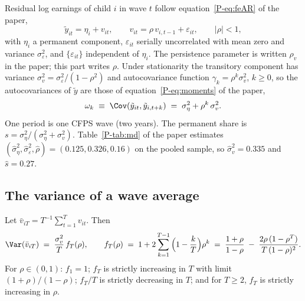 Residual log earnings of child $i$ in wave $t$ follow
equation~\eqref{P-eq:feAR} of the paper,
\begin{equation}
\tilde y_{it} = \eta_i + v_{it}, \qquad
v_{it} = \rho\, v_{i,t-1} + \varepsilon_{it}, \qquad |\rho| < 1,
\label{fr:eq:model}
\end{equation}
with $\eta_i$ a permanent component, $\varepsilon_{it}$ serially
uncorrelated with mean zero and variance $\sigma^2_\varepsilon$, and
$\{\varepsilon_{it}\}$ independent of $\eta_i$. The persistence parameter
is written $\rho_v$ in the paper; this part writes $\rho$. Under
stationarity the transitory component has variance
$\sigma^2_v = \sigma^2_\varepsilon/(1-\rho^2)$ and autocovariance function
$\gamma_k = \rho^{k}\sigma^2_v$, $k \ge 0$, so the autocovariances of
$\tilde y$ are those of equation~\eqref{P-eq:moments} of the paper,
\begin{equation}
\omega_k \;\equiv\; \Cov(\tilde y_{it}, \tilde y_{i,t+k}) \;=\; \sigma^2_\eta + \rho^{k}\,\sigma^2_v .
\label{fr:eq:omega}
\end{equation}
One period is one CFPS wave (two years). The permanent share is
$s = \sigma^2_\eta/(\sigma^2_\eta + \sigma^2_v)$. Table~\ref{P-tab:md} of
the paper estimates $(\hat\sigma^2_\eta, \hat\sigma^2_\varepsilon, \hat\rho) =
(0.125, 0.326, 0.16)$ on the pooled sample, so $\hat\sigma^2_v = 0.335$ and
$\hat s = 0.27$.

\subsection{The variance of a wave average}

\begin{proposition}
\label{fr:prop:fT}
Let $\bar v_{iT} = T^{-1}\sum_{t=1}^{T} v_{it}$. Then
\begin{equation}
\Var(\bar v_{iT}) \;=\; \frac{\sigma^2_v}{T}\, f_T(\rho), \qquad
f_T(\rho) \;=\; 1 + 2\sum_{k=1}^{T-1}\Big(1 - \frac{k}{T}\Big)\rho^{k}
\;=\; \frac{1+\rho}{1-\rho} \;-\; \frac{2\rho\,(1-\rho^{T})}{T\,(1-\rho)^{2}} .
\label{fr:eq:fT}
\end{equation}
For $\rho \in (0,1)$: $f_1 = 1$; $f_T$ is strictly increasing in $T$ with
limit $(1+\rho)/(1-\rho)$; $f_T/T$ is strictly decreasing in $T$; and for
$T \ge 2$, $f_T$ is strictly increasing in $\rho$.
\end{proposition}

